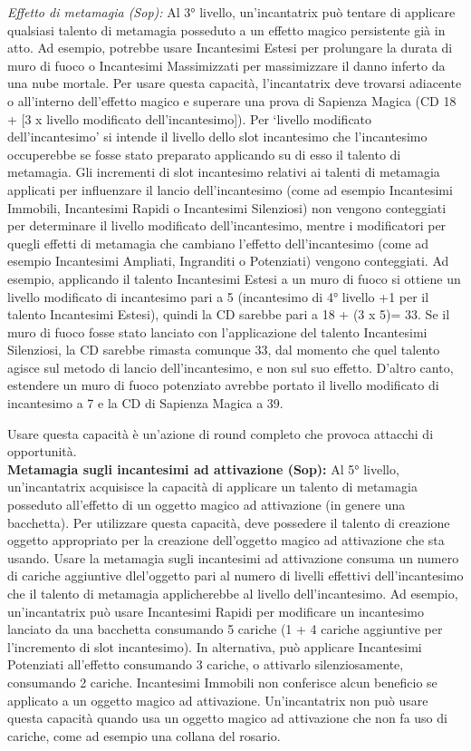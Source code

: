 \documentclass[a4paper]{report}
\begin{document}
\begin{multicols}{2}
\textit{Effetto di metamagia (Sop):} Al 3° livello, un'incantatrix può tentare di applicare qualsiasi talento di metamagia posseduto a un effetto magico persistente già in atto. Ad esempio, potrebbe usare Incantesimi Estesi per prolungare la durata di muro di fuoco o Incantesimi Massimizzati per massimizzare il danno inferto da una nube mortale. Per usare questa capacità, l'incantatrix deve trovarsi adiacente o all'interno dell'effetto magico e superare una prova di Sapienza Magica (CD 18 + [3 x livello modificato dell'incantesimo]). Per \enquote*{livello modificato dell'incantesimo} si intende il livello dello slot incantesimo che l'incantesimo occuperebbe se fosse stato preparato applicando su di esso il talento di metamagia. Gli incrementi di slot incantesimo relativi ai talenti di metamagia applicati per influenzare il lancio dell'incantesimo (come ad esempio Incantesimi Immobili, Incantesimi Rapidi o Incantesimi Silenziosi) non vengono conteggiati per determinare il livello modificato dell'incantesimo, mentre i modificatori per quegli effetti di metamagia che cambiano l'effetto dell'incantesimo (come ad esempio Incantesimi Ampliati, Ingranditi o Potenziati) vengono conteggiati.
Ad esempio, applicando il talento Incantesimi Estesi a un muro di fuoco si ottiene un livello modificato di incantesimo pari a 5 (incantesimo di 4° livello +1 per il talento Incantesimi Estesi), quindi la CD sarebbe pari a 18 + (3 x 5)= 33. Se il muro di fuoco fosse stato lanciato con l'applicazione del talento Incantesimi Silenziosi, la CD sarebbe rimasta comunque 33, dal momento che quel talento agisce sul metodo di lancio dell'incantesimo, e non sul suo effetto. D'altro canto, estendere un muro di fuoco potenziato avrebbe portato il livello modificato di incantesimo a 7 e la CD di Sapienza Magica a 39.

Usare questa capacità è un'azione di round completo che provoca attacchi di opportunità.\\

\textbf{Metamagia sugli incantesimi ad attivazione (Sop):} Al 5° livello, un'incantatrix acquisisce la capacità di applicare un talento di metamagia posseduto all'effetto di un oggetto magico ad attivazione (in genere una bacchetta). Per utilizzare questa capacità, deve possedere il talento di creazione oggetto appropriato per la creazione dell'oggetto magico ad attivazione che sta usando. Usare la metamagia sugli incantesimi ad attivazione consuma un numero di cariche aggiuntive dlel'oggetto pari al numero di livelli effettivi dell'incantesimo che il talento di metamagia applicherebbe al livello dell'incantesimo. Ad esempio, un'incantatrix può usare Incantesimi Rapidi per modificare un incantesimo lanciato da una bacchetta consumando 5 cariche (1 + 4 cariche aggiuntive per l'incremento di slot incantesimo). In alternativa, può applicare Incantesimi Potenziati all'effetto consumando 3 cariche, o attivarlo silenziosamente, consumando 2 cariche. Incantesimi Immobili non conferisce alcun beneficio se applicato a un oggetto magico ad attivazione.
Un'incantatrix non può usare questa capacità quando usa un oggetto magico ad attivazione che non fa uso di cariche, come ad esempio una collana del rosario.\\


\end{multicols}
\end{document}
